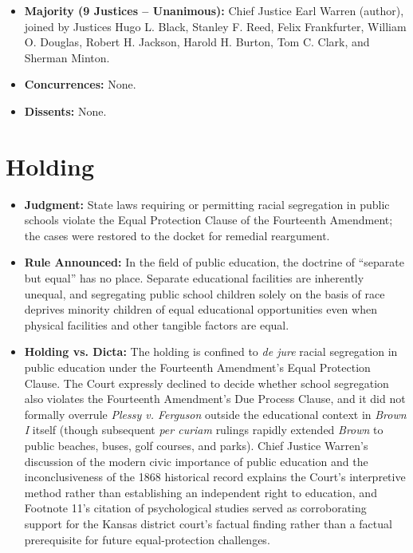 \documentclass[12pt]{article}
\begin{document}
\begin{itemize}
  \item \textbf{Majority (9 Justices -- Unanimous):} Chief Justice Earl Warren (author), joined by Justices Hugo L. Black, Stanley F. Reed, Felix Frankfurter, William O. Douglas, Robert H. Jackson, Harold H. Burton, Tom C. Clark, and Sherman Minton.
  \item \textbf{Concurrences:} None.
  \item \textbf{Dissents:} None.
\end{itemize}

\section{Holding}

\begin{itemize}
  \item \textbf{Judgment:} State laws requiring or permitting racial segregation in public schools violate the Equal Protection Clause of the Fourteenth Amendment; the cases were restored to the docket for remedial reargument.
  \item \textbf{Rule Announced:} In the field of public education, the doctrine of ``separate but equal'' has no place. Separate educational facilities are inherently unequal, and segregating public school children solely on the basis of race deprives minority children of equal educational opportunities even when physical facilities and other tangible factors are equal.
  \item \textbf{Holding vs. Dicta:} The holding is confined to \textit{de jure} racial segregation in public education under the Fourteenth Amendment's Equal Protection Clause. The Court expressly declined to decide whether school segregation also violates the Fourteenth Amendment's Due Process Clause, and it did not formally overrule \textit{Plessy v. Ferguson} outside the educational context in \textit{Brown I} itself (though subsequent \textit{per curiam} rulings rapidly extended \textit{Brown} to public beaches, buses, golf courses, and parks). Chief Justice Warren's discussion of the modern civic importance of public education and the inconclusiveness of the 1868 historical record explains the Court's interpretive method rather than establishing an independent right to education, and Footnote 11's citation of psychological studies served as corroborating support for the Kansas district court's factual finding rather than a factual prerequisite for future equal-protection challenges.
\end{itemize}
\end{document}
